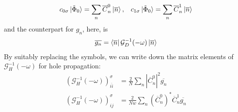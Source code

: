 \documentclass[12pt]{article}
\numberwithin{equation}{section}
\begin{document}
\begin{equation}\begin{aligned}
	c_{0\sigma}\ket{\tilde \Phi_0} = \sum_n \overline C^0_n \ket{\overline{n}}, && c_{1\sigma}\ket{\tilde \Phi_0} = \sum_n \overline C^1_n \ket{\overline{n}}%
\end{aligned}\end{equation}
and the counterpart for $g_n$, here, is
\begin{equation}\begin{aligned}
	\overline {g_n} = \bra{\overline n}\mathcal{G}_{D}^{-1}(-\omega)\ket{\overline n}
\end{aligned}\end{equation}
By suitably replacing the symbols, we can write down the matrix elements of $\mathcal{G}_H^{-1}(-\omega)$ for hole propagation:
\begin{equation}\begin{aligned}
	\left(\mathcal{G}_{H}^{-1}(-\omega)\right)_{\overline{ii}}^\sigma &= \frac{2}{N}\sum_{n} |\overline C^0_{n}|^2 \overline{g_n}\\
	\left(\mathcal{G}_{H}^{-1}(-\omega)\right)_{ij}^\sigma &= \frac{2}{Nw}\sum_{n} \left(\overline C^0_{n}\right)^* \overline C^1_{n} \overline{g_n} 
\end{aligned}\end{equation}


\end{document}
